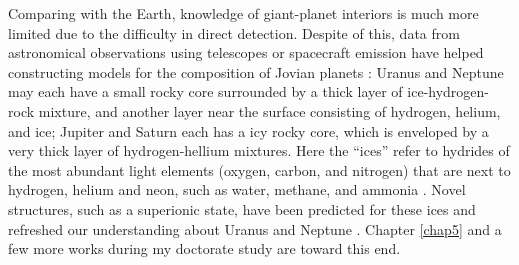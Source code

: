 


Comparing with the Earth, knowledge of giant-planet interiors is much more limited due to the difficulty in direct detection. Despite of this, data from astronomical observations using telescopes or spacecraft emission have helped constructing models for the composition of Jovian planets \cite{Guillot2004}: Uranus and Neptune may each have a small rocky core surrounded by a thick layer of ice-hydrogen-rock mixture, and another layer near the surface consisting of hydrogen, helium, and ice; Jupiter and Saturn each has a icy rocky core, which is enveloped by a very thick layer of hydrogen-hellium mixtures. Here the ``ices'' refer to hydrides of the most abundant light elements (oxygen, carbon, and nitrogen) that are next to hydrogen, helium and neon, such as water, methane, and ammonia \cite{Stevenson2013}. Novel structures, such as a superionic state, have been predicted for these ices and refreshed our understanding about Uranus and Neptune \cite{Cavazzoni1999,Wilson2013}. Chapter \ref{chap5} and a few more works \cite{Militzer2016a,Militzer2016b} during my doctorate study are toward this end.


